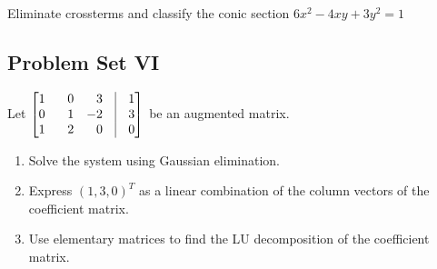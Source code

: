 \documentclass[crop=false,class=book,oneside]{standalone}                      %
\begin{document}
        \begin{problem}
        Eliminate crossterms and classify the conic section $6x^2 - 4xy+3y^2 = 1$
        \end{problem}
        \newpage
        \subsection{Problem Set VI}
        \begin{problem}
        Let $\begin{bmatrix*}[r] 1 & 0 & 3 & \vline & 1 \\ 0 & \phantom{-}1 & -2 & \vline & 3 \\ 1 & 2 & 0 & \vline & 0 \end{bmatrix*}$ be an augmented matrix.
        \begin{enumerate}
            \item Solve the system using Gaussian elimination.
            \item Express $(1,3,0)^{T}$ as a linear combination of the column vectors of the coefficient matrix.
            \item Use elementary matrices to find the LU decomposition of the coefficient matrix.
        \end{enumerate}
        \end{problem}
\end{document}
